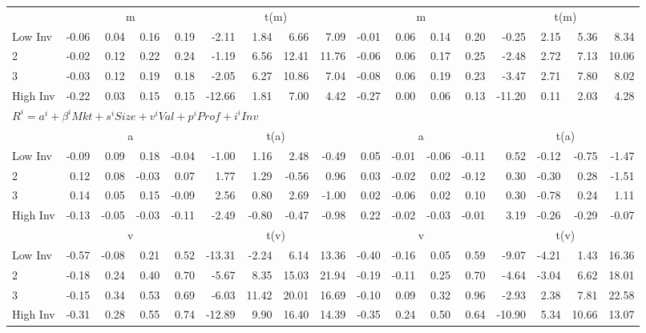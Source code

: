 \begin{table}[!ht]
\begin{tabular}{lrrrrrrrrrrrrrrrr}
  
     & \multicolumn{4}{c}{m} & \multicolumn{4}{c}{t(m)}  & \multicolumn{4}{c}{m} & \multicolumn{4}{c}{t(m)}   \\
     \cmidrule(r){2-5} \cmidrule(r){6-9}  \cmidrule(r){10-13} \cmidrule(r){14-17} 
    Low Inv  & -0.06  & 0.04  & 0.16  & 0.19  & -2.11  & 1.84  & 6.66  & 7.09  & -0.01  & 0.06  & 0.14  & 0.20  & -0.25  & 2.15  & 5.36  & 8.34   \\
    2  & -0.02  & 0.12  & 0.22  & 0.24  & -1.19  & 6.56  & 12.41  & 11.76  & -0.06  & 0.06  & 0.17  & 0.25  & -2.48  & 2.72  & 7.13  & 10.06   \\
    3  & -0.03  & 0.12  & 0.19  & 0.18  & -2.05  & 6.27  & 10.86  & 7.04  & -0.08  & 0.06  & 0.19  & 0.23  & -3.47  & 2.71  & 7.80  & 8.02   \\
    High Inv  & -0.22  & 0.03  & 0.15  & 0.15  & -12.66  & 1.81  & 7.00  & 4.42  & -0.27  & 0.00  & 0.06  & 0.13  & -11.20  & 0.11  & 2.03  & 4.28   \\
    
  
  \midrule
  \multicolumn{17}{l}{$R^i=a^i+\beta^iMkt+s^iSize+v^iVal+p^iProf+i^iInv$}  \\
  
     & \multicolumn{4}{c}{a} & \multicolumn{4}{c}{t(a)}  & \multicolumn{4}{c}{a} & \multicolumn{4}{c}{t(a)}   \\
     \cmidrule(r){2-5} \cmidrule(r){6-9}  \cmidrule(r){10-13} \cmidrule(r){14-17} 
    Low Inv  & -0.09  & 0.09  & 0.18  & -0.04  & -1.00  & 1.16  & 2.48  & -0.49  & 0.05  & -0.01  & -0.06  & -0.11  & 0.52  & -0.12  & -0.75  & -1.47   \\
    2  & 0.12  & 0.08  & -0.03  & 0.07  & 1.77  & 1.29  & -0.56  & 0.96  & 0.03  & -0.02  & 0.02  & -0.12  & 0.30  & -0.30  & 0.28  & -1.51   \\
    3  & 0.14  & 0.05  & 0.15  & -0.09  & 2.56  & 0.80  & 2.69  & -1.00  & 0.02  & -0.06  & 0.02  & 0.10  & 0.30  & -0.78  & 0.24  & 1.11   \\
    High Inv  & -0.13  & -0.05  & -0.03  & -0.11  & -2.49  & -0.80  & -0.47  & -0.98  & 0.22  & -0.02  & -0.03  & -0.01  & 3.19  & -0.26  & -0.29  & -0.07   \\
    
  
     & \multicolumn{4}{c}{v} & \multicolumn{4}{c}{t(v)}  & \multicolumn{4}{c}{v} & \multicolumn{4}{c}{t(v)}   \\
     \cmidrule(r){2-5} \cmidrule(r){6-9}  \cmidrule(r){10-13} \cmidrule(r){14-17} 
    Low Inv  & -0.57  & -0.08  & 0.21  & 0.52  & -13.31  & -2.24  & 6.14  & 13.36  & -0.40  & -0.16  & 0.05  & 0.59  & -9.07  & -4.21  & 1.43  & 16.36   \\
    2  & -0.18  & 0.24  & 0.40  & 0.70  & -5.67  & 8.35  & 15.03  & 21.94  & -0.19  & -0.11  & 0.25  & 0.70  & -4.64  & -3.04  & 6.62  & 18.01   \\
    3  & -0.15  & 0.34  & 0.53  & 0.69  & -6.03  & 11.42  & 20.01  & 16.69  & -0.10  & 0.09  & 0.32  & 0.96  & -2.93  & 2.38  & 7.81  & 22.58   \\
    High Inv  & -0.31  & 0.28  & 0.55  & 0.74  & -12.89  & 9.90  & 16.40  & 14.39  & -0.35  & 0.24  & 0.50  & 0.64  & -10.90  & 5.34  & 10.66  & 13.07   \\
    


\end{tabular}
\end{table}
